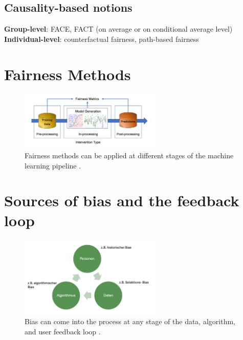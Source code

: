 \documentclass[11pt,a4paper]{article}
\begin{document}
\subsection*{Causality-based notions}
\textbf{Group-level}: FACE, FACT (on average or on conditional average level) \parencite{Zafar2017PPNFC}\\
\textbf{Individual-level}: counterfactual fairness, path-based fairness \parencite{kusner} 


\section{Fairness Methods}
\begin{figure}[h]
    \centering
    \includegraphics[width=0.6\textwidth]{../figures/fairness_methods.png}
    \caption{Fairness methods can be applied at different stages of the machine learning pipeline \parencite{caton2024}.}
\end{figure}
\section{Sources of bias and the feedback loop}
\begin{figure}[h]
    \centering
    \includegraphics[width=0.6\textwidth]{../figures/bias_loop.png}
    \caption{Bias can come into the process at any stage of the data, algorithm, and user feedback loop \parencite{mehrabi2022}.}
\end{figure} 

\renewcommand{\bibfont}{\scriptsize}  %
\printbibliography
\end{document}
